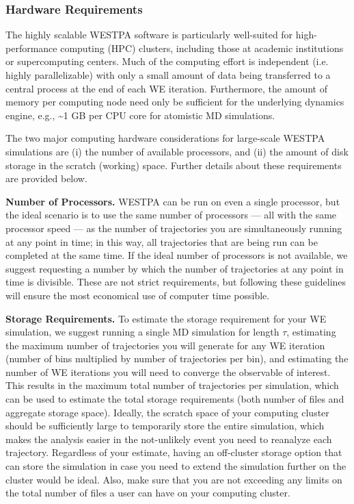 \documentclass[9pt,tutorial,pubversion]{livecoms}
\begin{document}
\subsubsection{Hardware Requirements}

The highly scalable WESTPA software is particularly well-suited for high-performance computing (HPC) clusters, including those at academic institutions or supercomputing centers. 
Much of the computing effort is independent (i.e. highly parallelizable) with only a small amount of data being transferred to a central process at the end of each WE iteration. 
Furthermore, the amount of memory per computing node need only be sufficient for the underlying dynamics engine, e.g., \textasciitilde 1 GB per CPU core for atomistic MD simulations. 

The two major computing hardware considerations for large-scale WESTPA simulations are (i) the number of available processors, and (ii) the amount of disk storage in the scratch (working) space. 
Further details about these requirements are provided below. 

\textbf{Number of Processors.} WESTPA can be run on even a single processor, but the ideal scenario is to use the same number of processors — all with the same processor speed — as the number of trajectories you are simultaneously running at any point in time; in this way, all trajectories that are being run can be completed at the same time. 
If the ideal number of processors is not available, we suggest requesting a number by which the number of trajectories at any point in time is divisible. 
These are not strict requirements, but following these guidelines will ensure the most economical use of computer time possible.

\textbf{Storage Requirements.} To estimate the storage requirement for your WE simulation, we suggest running a single MD simulation for length $\tau$, estimating the maximum number of trajectories you will generate for any WE iteration (number of bins multiplied by number of trajectories per bin), and estimating the number of WE iterations you will need to converge the observable of interest. 
This results in the maximum total number of trajectories per simulation, which can be used to estimate the total storage requirements (both number of files and aggregate storage space). 
Ideally, the scratch space of your computing cluster should be sufficiently large to temporarily store the entire simulation, which makes the analysis easier in the not-unlikely event you need to reanalyze each trajectory. 
Regardless of your estimate, having an off-cluster storage option that can store the simulation in case you need to extend the simulation further on the cluster would be ideal. 
Also, make sure that you are not exceeding any limits on the total number of files a user can have on your computing cluster. 
\end{document}
